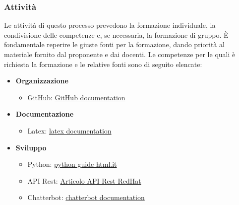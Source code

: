 \subsubsection{Attività}
Le attività di questo processo prevedono la formazione individuale, la condivisione delle competenze e, se 
necessaria, la formazione di gruppo. È fondamentale reperire le giuste fonti per la formazione, dando priorità 
al materiale fornito dal proponente e dai docenti. Le competenze per le quali è richiesta la formazione e le 
relative fonti sono di seguito elencate:
\begin{itemize}
	\item \textbf{Organizzazione}
		\begin{itemize}		
			\item GitHub: \href{https://docs.github.com/en}{GitHub documentation}
		\end{itemize}
	\item \textbf{Documentazione}
		\begin{itemize}
			\item Latex: \href{https://www.latex-project.org/help/}{latex documentation}
		\end{itemize}
	\item \textbf{Sviluppo}
		\begin{itemize}
			\item Python: \href{https://www.html.it/guide/guida-python/}{python guide html.it}
			\item API Rest: \href{https://www.redhat.com/it/topics/api/what-is-a-rest-api}{Articolo API Rest RedHat}
			\item Chatterbot: \href{https://chatterbot.readthedocs.io/en/stable/}{chatterbot documentation}
		\end{itemize}
\end{itemize}